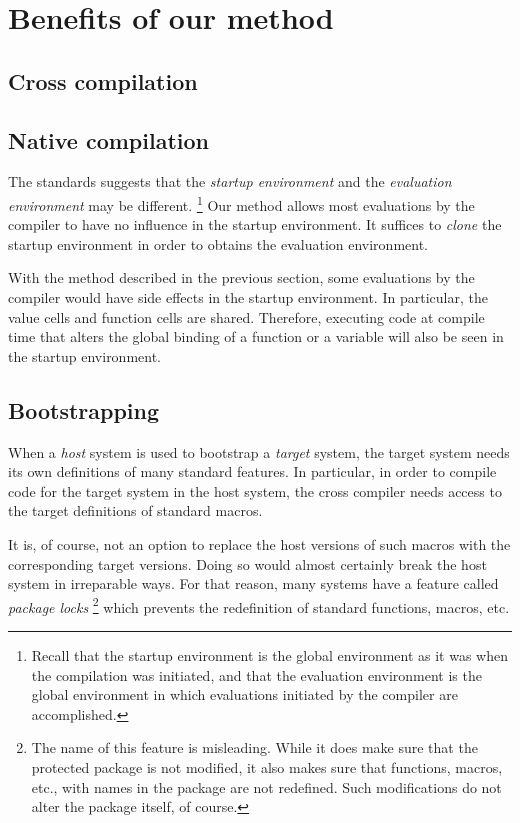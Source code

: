 \section{Benefits of our method}
 
\subsection{Cross compilation}

\subsection{Native compilation}

The \commonlisp{} standards suggests that the \emph{startup
  environment} and the \emph{evaluation environment} may be
different.%
\footnote{Recall that the startup environment is the global
environment as it was when the compilation was initiated, and that the
evaluation environment is the global environment in which evaluations
initiated by the compiler are accomplished.}
Our method allows most evaluations by the compiler to have no
influence in the startup environment.  It suffices to \emph{clone} the
startup environment in order to obtains the evaluation environment. 

With the method described in the previous section, some evaluations
by the compiler would have side effects in the startup environment.
In particular, the value cells and function cells are shared.
Therefore, executing code at compile time that alters the global
binding of a function or a variable will also be seen in the startup
environment.  

\subsection{Bootstrapping}

When a \emph{host} \commonlisp{} system is used to bootstrap a
\emph{target} \commonlisp{} system, the target system needs its own
definitions of many standard \commonlisp{} features.  In particular,
in order to compile code for the target system in the host system, the
cross compiler needs access to the target definitions of standard
\commonlisp{} macros.

It is, of course, not an option to replace the host versions of such
macros with the corresponding target versions.  Doing so would almost
certainly break the host system in irreparable ways.  For that reason,
many \commonlisp{} systems have a feature called \emph{package locks}%
\footnote{The name of this feature is misleading.  While it does make
  sure that the protected package is not modified, it also makes sure
  that functions, macros, etc., with names in the package are not
  redefined.  Such modifications do not alter the package itself, of
  course.}
which prevents the redefinition of standard \commonlisp{} functions,
macros, etc.

